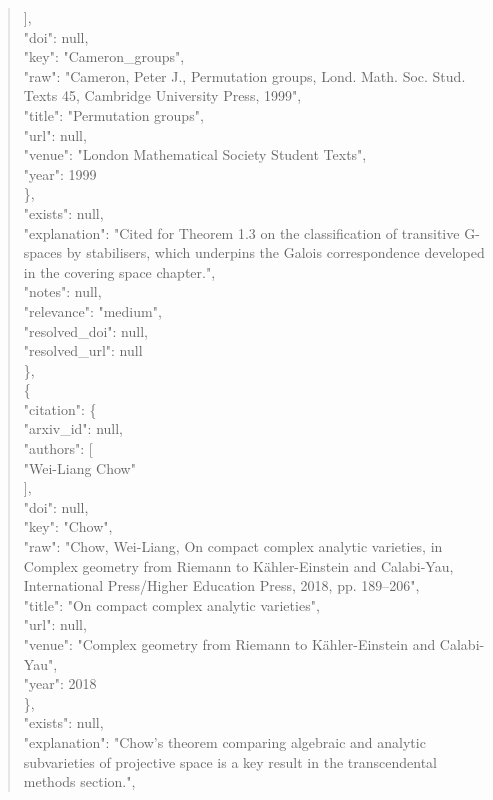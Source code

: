 \documentclass[11pt]{article}
\begin{document}
\begin{quote}
        ],\\
        "doi": null,\\
        "key": "Cameron\_groups",\\
        "raw": "Cameron, Peter J., Permutation groups, Lond. Math. Soc. Stud. Texts 45, Cambridge University Press, 1999",\\
        "title": "Permutation groups",\\
        "url": null,\\
        "venue": "London Mathematical Society Student Texts",\\
        "year": 1999\\
      \},\\
      "exists": null,\\
      "explanation": "Cited for Theorem 1.3 on the classification of transitive G-spaces by stabilisers, which underpins the Galois correspondence developed in the covering space chapter.",\\
      "notes": null,\\
      "relevance": "medium",\\
      "resolved\_doi": null,\\
      "resolved\_url": null\\
    \},\\
    \{\\
      "citation": \{\\
        "arxiv\_id": null,\\
        "authors": [\\
          "Wei-Liang Chow"\\
        ],\\
        "doi": null,\\
        "key": "Chow",\\
        "raw": "Chow, Wei-Liang, On compact complex analytic varieties, in Complex geometry from Riemann to Kähler-Einstein and Calabi-Yau, International Press/Higher Education Press, 2018, pp. 189--206",\\
        "title": "On compact complex analytic varieties",\\
        "url": null,\\
        "venue": "Complex geometry from Riemann to Kähler-Einstein and Calabi-Yau",\\
        "year": 2018\\
      \},\\
      "exists": null,\\
      "explanation": "Chow's theorem comparing algebraic and analytic subvarieties of projective space is a key result in the transcendental methods section.",\\

\end{quote}
\end{document}
